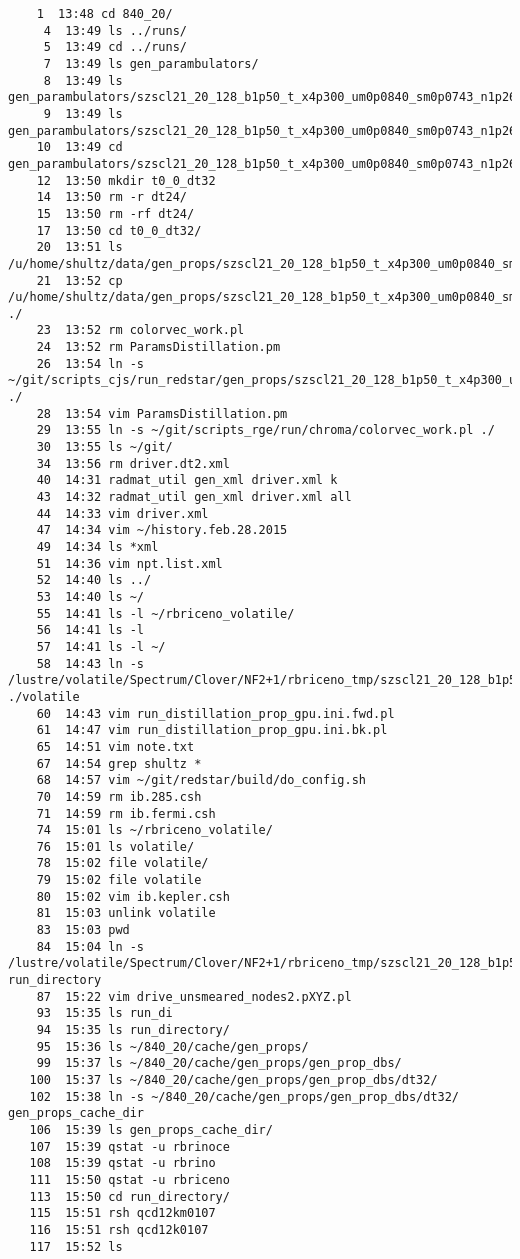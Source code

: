 \documentclass[prd,showpacs,showkeys,preprintnumbers,floatfix,
nofootinbib,superscriptaddress]{revtex4}
\begin{document}
\begin{verbatim}
    1  13:48 cd 840_20/
     4  13:49 ls ../runs/
     5  13:49 cd ../runs/
     7  13:49 ls gen_parambulators/
     8  13:49 ls gen_parambulators/szscl21_20_128_b1p50_t_x4p300_um0p0840_sm0p0743_n1p265/
     9  13:49 ls gen_parambulators/szscl21_20_128_b1p50_t_x4p300_um0p0840_sm0p0743_n1p265/dt24/isospin0_annih/
    10  13:49 cd gen_parambulators/szscl21_20_128_b1p50_t_x4p300_um0p0840_sm0p0743_n1p265/
    12  13:50 mkdir t0_0_dt32
    14  13:50 rm -r dt24/
    15  13:50 rm -rf dt24/
    17  13:50 cd t0_0_dt32/
    20  13:51 ls /u/home/shultz/data/gen_props/szscl21_20_128_b1p50_t_x4p300_um0p0840_sm0p0743_n1p265/combined_run/t0_0_dt32
    21  13:52 cp /u/home/shultz/data/gen_props/szscl21_20_128_b1p50_t_x4p300_um0p0840_sm0p0743_n1p265/combined_run/t0_0_dt32/* ./
    23  13:52 rm colorvec_work.pl
    24  13:52 rm ParamsDistillation.pm
    26  13:54 ln -s ~/git/scripts_cjs/run_redstar/gen_props/szscl21_20_128_b1p50_t_x4p300_um0p0840_sm0p0743_n1p265_per/ParamsDistillation.pm ./
    28  13:54 vim ParamsDistillation.pm
    29  13:55 ln -s ~/git/scripts_rge/run/chroma/colorvec_work.pl ./
    30  13:55 ls ~/git/
    34  13:56 rm driver.dt2.xml
    40  14:31 radmat_util gen_xml driver.xml k
    43  14:32 radmat_util gen_xml driver.xml all
    44  14:33 vim driver.xml
    47  14:34 vim ~/history.feb.28.2015
    49  14:34 ls *xml
    51  14:36 vim npt.list.xml
    52  14:40 ls ../
    53  14:40 ls ~/
    55  14:41 ls -l ~/rbriceno_volatile/
    56  14:41 ls -l
    57  14:41 ls -l ~/
    58  14:43 ln -s /lustre/volatile/Spectrum/Clover/NF2+1/rbriceno_tmp/szscl21_20_128_b1p50_t_x4p300_um0p0840_sm0p0743_n1p265_per ./volatile
    60  14:43 vim run_distillation_prop_gpu.ini.fwd.pl
    61  14:47 vim run_distillation_prop_gpu.ini.bk.pl
    65  14:51 vim note.txt
    67  14:54 grep shultz *
    68  14:57 vim ~/git/redstar/build/do_config.sh
    70  14:59 rm ib.285.csh
    71  14:59 rm ib.fermi.csh
    74  15:01 ls ~/rbriceno_volatile/
    76  15:01 ls volatile/
    78  15:02 file volatile/
    79  15:02 file volatile
    80  15:02 vim ib.kepler.csh
    81  15:03 unlink volatile
    83  15:03 pwd
    84  15:04 ln -s /lustre/volatile/Spectrum/Clover/NF2+1/rbriceno_tmp/szscl21_20_128_b1p50_t_x4p300_um0p0840_sm0p0743_n1p265_per/gen_prop_t0_0_dt32 run_directory
    87  15:22 vim drive_unsmeared_nodes2.pXYZ.pl
    93  15:35 ls run_di
    94  15:35 ls run_directory/
    95  15:36 ls ~/840_20/cache/gen_props/
    99  15:37 ls ~/840_20/cache/gen_props/gen_prop_dbs/
   100  15:37 ls ~/840_20/cache/gen_props/gen_prop_dbs/dt32/
   102  15:38 ln -s ~/840_20/cache/gen_props/gen_prop_dbs/dt32/ gen_props_cache_dir
   106  15:39 ls gen_props_cache_dir/
   107  15:39 qstat -u rbrinoce
   108  15:39 qstat -u rbrino
   111  15:50 qstat -u rbriceno
   113  15:50 cd run_directory/
   115  15:51 rsh qcd12km0107
   116  15:51 rsh qcd12k0107
   117  15:52 ls
\end{verbatim} 
\normalsize
\end{document}
